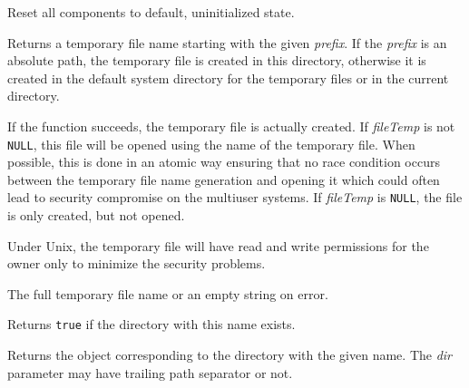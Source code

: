 
Reset all components to default, uninitialized state.


\label{wxfilenamecreatetempfilename}


Returns a temporary file name starting with the given {\it prefix}. If
the {\it prefix} is an absolute path, the temporary file is created in this
directory, otherwise it is created in the default system directory for the
temporary files or in the current directory.

If the function succeeds, the temporary file is actually created. If\rtfsp
{\it fileTemp} is not {\tt NULL}, this file will be opened using the name of
the temporary file. When possible, this is done in an atomic way ensuring that
no race condition occurs between the temporary file name generation and opening
it which could often lead to security compromise on the multiuser systems.
If {\it fileTemp} is {\tt NULL}, the file is only created, but not opened.

Under Unix, the temporary file will have read and write permissions for the
owner only to minimize the security problems.





The full temporary file name or an empty string on error.


\label{wxfilenamedirexists}



Returns {\tt true} if the directory with this name exists.


\label{wxfilenamedirname}


Returns the object corresponding to the directory with the given name.
The {\it dir} parameter may have trailing path separator or not.



